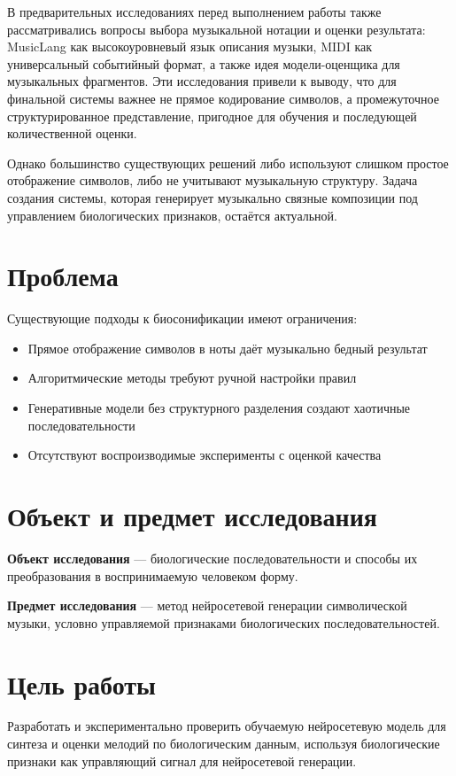 В предварительных исследованиях перед выполнением работы также рассматривались вопросы выбора музыкальной нотации и оценки результата: MusicLang как высокоуровневый язык описания музыки, MIDI как универсальный событийный формат, а также идея модели-оценщика для музыкальных фрагментов. Эти исследования привели к выводу, что для финальной системы важнее не прямое кодирование символов, а промежуточное структурированное представление, пригодное для обучения и последующей количественной оценки.

Однако большинство существующих решений либо используют слишком простое отображение символов, либо не учитывают музыкальную структуру. Задача создания системы, которая генерирует музыкально связные композиции под управлением биологических признаков, остаётся актуальной.

\section*{Проблема}

Существующие подходы к биосонификации имеют ограничения:
\begin{itemize}
\item Прямое отображение символов в ноты даёт музыкально бедный результат
\item Алгоритмические методы требуют ручной настройки правил
\item Генеративные модели без структурного разделения создают хаотичные последовательности
\item Отсутствуют воспроизводимые эксперименты с оценкой качества
\end{itemize}

\section*{Объект и предмет исследования}

\textbf{Объект исследования} — биологические последовательности и способы их преобразования в воспринимаемую человеком форму.

\textbf{Предмет исследования} — метод нейросетевой генерации символической музыки, условно управляемой признаками биологических последовательностей.

\section*{Цель работы}

Разработать и экспериментально проверить обучаемую нейросетевую модель для синтеза и оценки мелодий по биологическим данным, используя биологические признаки как управляющий сигнал для нейросетевой генерации.


